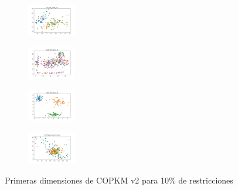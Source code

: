 \begin{figure}[H]
\begin{subfigure}
    \end{subfigure}
    \hfill
    \begin{subfigure}
        \centering
        \includegraphics[width=0.234\textwidth]{img/hs-ls/iris_set_const_10_3773969821_clust.png}
    \end{subfigure}
    \hfill
    \begin{subfigure}
        \centering
        \includegraphics[width=0.234\textwidth]{img/hs-ls/ecoli_set_const_10_3773969821_clust.png}
    \end{subfigure}
    \hfill
    \begin{subfigure}
        \centering
        \includegraphics[width=0.234\textwidth]{img/hs-ls/rand_set_const_10_3773969821_clust.png}
    \end{subfigure}
    \hfill
    \begin{subfigure}
        \centering
        \includegraphics[width=0.234\textwidth]{img/hs-ls/newthyroid_set_const_10_3773969821_clust.png}
    \end{subfigure}
    \caption{Primeras dimensiones de COPKM v2 para 10\% de restricciones}
\end{figure}

\vspace*{\fill}
\newpage
\vspace*{\fill}

